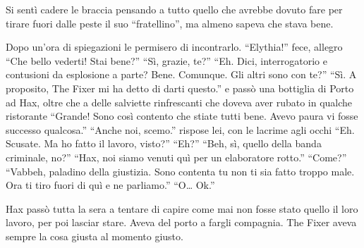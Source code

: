     Si sentì cadere le braccia pensando a tutto quello che avrebbe dovuto
    fare per tirare fuori dalle peste il suo ``fratellino'', ma almeno
    sapeva che stava bene.

    Dopo un'ora di spiegazioni le permisero di incontrarlo. ``Elythia!''
    fece, allegro ``Che bello vederti! Stai bene?'' ``Sì, grazie, te?''
    ``Eh. Dici, interrogatorio e contusioni da esplosione a parte? Bene.
    Comunque. Gli altri sono con te?'' ``Sì. A proposito, The Fixer mi ha
    detto di darti questo.'' e passò una bottiglia di Porto ad Hax, oltre
    che a delle salviette rinfrescanti che doveva aver rubato in qualche
    ristorante ``Grande! Sono così contento che stiate tutti bene. Avevo
    paura vi fosse successo qualcosa.'' ``Anche noi, scemo.'' rispose lei,
    con le lacrime agli occhi ``Eh. Scusate. Ma ho fatto il lavoro,
    visto?'' ``Eh?'' ``Beh, sì, quello della banda criminale, no?'' ``Hax,
    noi siamo venuti quì per un elaboratore rotto.'' ``Come?'' ``Vabbeh,
    paladino della giustizia. Sono contenta tu non ti sia fatto troppo
    male. Ora ti tiro fuori di quì e ne parliamo.'' ``O\dots{} Ok.''

    Hax passò tutta la sera a tentare di capire come mai non fosse stato
    quello il loro lavoro, per poi lasciar stare. Aveva del porto a fargli
    compagnia. The Fixer aveva sempre la cosa giusta al momento giusto.

\cleardoublepage{}
